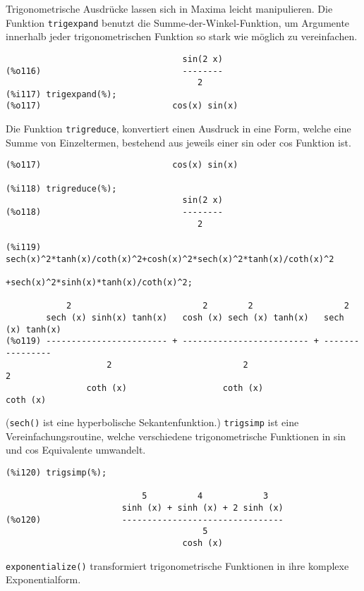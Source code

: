 \documentclass[12pt]{scrartcl}
\begin{document}
Trigonometrische Ausdrücke lassen sich in Maxima leicht manipulieren.
Die Funktion \texttt{trigexpand} benutzt die
Summe-der-Winkel-Funktion,  um Argumente innerhalb jeder
trigonometrischen Funktion so stark wie möglich zu vereinfachen.

\begin{verbatim}
                                   sin(2 x)
(%o116)                            --------
                                      2
(%i117) trigexpand(%);
(%o117)                          cos(x) sin(x)
\end{verbatim}

Die Funktion \texttt{trigreduce}, konvertiert einen Ausdruck in eine
Form, welche eine Summe von Einzeltermen, bestehend aus jeweils einer
sin oder cos Funktion ist.

\begin{verbatim}
(%o117)                          cos(x) sin(x)

(%i118) trigreduce(%);
                                   sin(2 x)
(%o118)                            --------
                                      2

(%i119) sech(x)^2*tanh(x)/coth(x)^2+cosh(x)^2*sech(x)^2*tanh(x)/coth(x)^2
                                   +sech(x)^2*sinh(x)*tanh(x)/coth(x)^2;

            2                          2        2                  2
        sech (x) sinh(x) tanh(x)   cosh (x) sech (x) tanh(x)   sech (x) tanh(x)
(%o119) ------------------------ + ------------------------- + ----------------
                    2                          2                       2
                coth (x)                   coth (x)                coth (x)
\end{verbatim}

(\texttt{sech()} ist eine hyperbolische Sekantenfunktion.)
\texttt{trigsimp} ist eine Vereinfachungsroutine, welche verschiedene
trigonometrische Funktionen in sin und cos Equivalente umwandelt.

\begin{verbatim}
(%i120) trigsimp(%);

                           5          4            3
                       sinh (x) + sinh (x) + 2 sinh (x)
(%o120)                --------------------------------
                                       5
                                   cosh (x)
\end{verbatim}

\texttt{exponentialize()} transformiert trigonometrische Funktionen in ihre komplexe Exponentialform.
\end{document}
